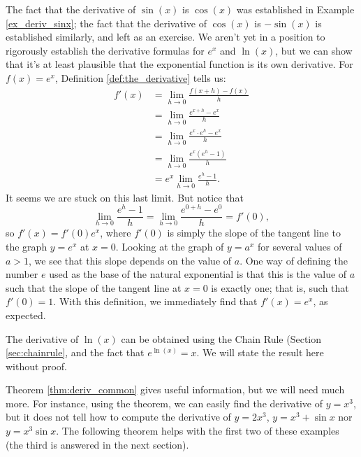 The fact that the derivative of $\sin(x)$ is $\cos(x)$ was established in Example \ref{ex_deriv_sinx}; the fact that the derivative of $\cos(x)$ is $-\sin(x)$ is established similarly, and left as an exercise. We aren't yet in a position to rigorously establish the derivative formulas for $e^x$ and $\ln(x)$, but we can show that it's at least plausible that the exponential function is its own derivative. For $f(x)=e^x$, Definition \ref{def:the_derivative} tells us:
\begin{align*}
f'(x) & = \lim_{h\to 0}\frac{f(x+h)-f(x)}{h}\\
& = \lim_{h\to 0}\frac{e^{x+h}-e^x}{h}\\
& = \lim_{h\to 0}\frac{e^x\cdot e^h - e^x}{h} \tag{Laws of exponents}\\
& = \lim_{h\to 0}\frac{e^x(e^h-1)}{h} \tag{Factoring}\\
& = e^x\lim_{h\to 0}\frac{e^h-1}{h}.
\end{align*}
It seems we are stuck on this last limit. But notice that
\[
\lim_{h\to 0}\frac{e^h-1}{h} = \lim_{h\to 0}\frac{e^{0+h}-e^0}{h} = f'(0),
\]
so $f'(x) = f'(0)e^x$, where $f'(0)$ is simply the slope of the tangent line to the graph $y=e^x$ at $x=0$. Looking at the graph of $y=a^x$ for several values of $a>1$, we see that this slope depends on the value of $a$. One way of defining the number $e$ used as the base of the natural exponential is that this is the value of $a$ such that the slope of the tangent line at $x=0$ is exactly one; that is, such that $f'(0)=1$. With this definition, we immediately find that $f'(x)=e^x$, as expected.


The derivative of $\ln(x)$ can be obtained using the Chain Rule (Section \ref{sec:chainrule}, and the fact that $e^{\ln(x)}=x$. We will state the result here without proof.


Theorem \ref{thm:deriv_common} gives useful information, but we will need much more. For instance, using the theorem, we can easily find the derivative of $y=x^3$, but it does not tell how to compute the derivative of $y=2x^3$, $y=x^3+\sin x$ nor $y=x^3\sin x$. The following theorem helps with the first two of these examples (the third is answered in the next section).
\enlargethispage{\baselineskip}


